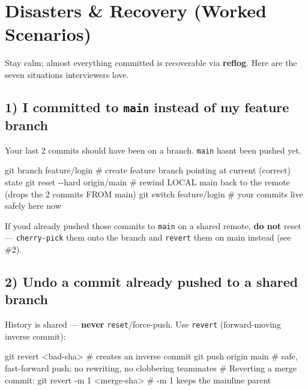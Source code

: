 \documentclass[11pt]{article}
\newenvironment{Shaded}{\begin{snugshade}}{\end{snugshade}}
\newcommand{\AttributeTok}[1]{\textcolor[rgb]{0.16,0.50,0.73}{#1}}
\newcommand{\CommentTok}[1]{\textcolor[rgb]{0.48,0.49,0.49}{#1}}
\newcommand{\FunctionTok}[1]{\textcolor[rgb]{0.56,0.27,0.68}{#1}}
\newcommand{\NormalTok}[1]{\textcolor[rgb]{0.81,0.81,0.76}{#1}}
\newcommand{\OperatorTok}[1]{\textcolor[rgb]{0.81,0.81,0.76}{#1}}
\begin{document}
\section{Disasters \& Recovery (Worked Scenarios)}\label{disasters--recovery-worked-scenarios}

Stay calm; almost everything committed is recoverable via \textbf{reflog}. Here are the seven situations interviewers love.

\subsection{\texorpdfstring{1) I committed to \texttt{main} instead of my feature branch}{1) I committed to main instead of my feature branch}}\label{1-i-committed-to-main-instead-of-my-feature-branch}

Your last 2 commits should have been on a branch. \texttt{main} hasn\textquotesingle t been pushed yet.


\begin{Shaded}
\begin{Highlighting}[]
\FunctionTok{git}\NormalTok{ branch feature/login            }\CommentTok{\# create feature branch pointing at current (correct) state}
\FunctionTok{git}\NormalTok{ reset }\AttributeTok{{-}{-}hard}\NormalTok{ origin/main        }\CommentTok{\# rewind LOCAL main back to the remote (drops the 2 commits FROM main)}
\FunctionTok{git}\NormalTok{ switch feature/login            }\CommentTok{\# your commits live safely here now}
\end{Highlighting}
\end{Shaded}

If you\textquotesingle d already pushed those commits to \texttt{main} on a shared remote, \textbf{do not} reset --- \texttt{cherry-pick} them onto the branch and \texttt{revert} them on main instead (see \#2).

\subsection{2) Undo a commit already pushed to a shared branch}\label{2-undo-a-commit-already-pushed-to-a-shared-branch}

History is shared --- \textbf{never} \texttt{reset}/force-push. Use \texttt{revert} (forward-moving inverse commit):


\begin{Shaded}
\begin{Highlighting}[]
\FunctionTok{git}\NormalTok{ revert }\OperatorTok{\textless{}}\NormalTok{bad{-}sha}\OperatorTok{\textgreater{}}      \CommentTok{\# creates an inverse commit}
\FunctionTok{git}\NormalTok{ push origin main      }\CommentTok{\# safe, fast{-}forward push; no rewriting, no clobbering teammates}
\CommentTok{\# Reverting a merge commit:}
\FunctionTok{git}\NormalTok{ revert }\AttributeTok{{-}m}\NormalTok{ 1 }\OperatorTok{\textless{}}\NormalTok{merge{-}sha}\OperatorTok{\textgreater{}}   \CommentTok{\# {-}m 1 keeps the mainline parent}
\end{Highlighting}
\end{Shaded}
\end{document}
